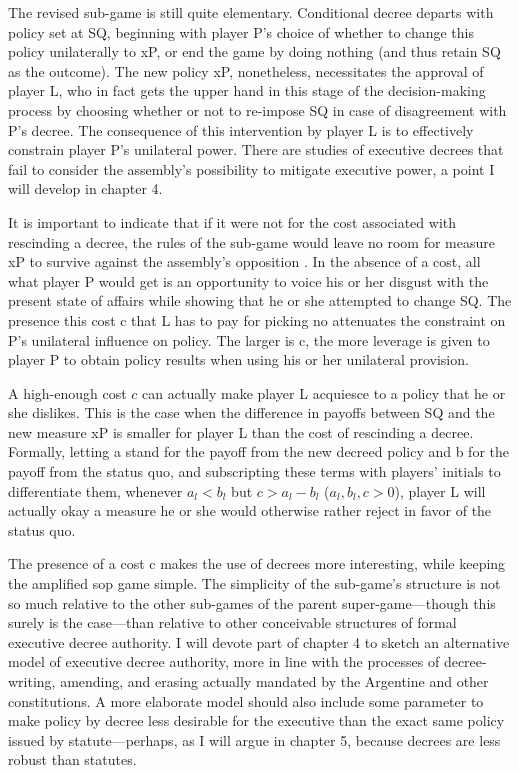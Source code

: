 The revised sub-game is still quite elementary.  Conditional decree departs with policy set at SQ, beginning with player P's choice of whether to change this policy unilaterally to xP, or end the game by doing nothing (and thus retain SQ as the outcome).  The new policy xP, nonetheless, necessitates the approval of player L, who in fact gets the upper hand in this stage of the decision-making process by choosing whether or not to re-impose SQ in case of disagreement with P's decree.  The consequence of this intervention by player L is to effectively constrain player P's unilateral power.  There are studies of executive decrees that fail to consider the assembly's possibility to mitigate executive power, a point I will develop in chapter 4.  

It is important to indicate that if it were not for the cost associated with rescinding a decree, the rules of the sub-game would leave no room for measure xP to survive against the assembly's opposition \citep{shugart.invExPty.1998,power.1998}.  In the absence of a cost, all what player P would get is an opportunity to voice his or her disgust with the present state of affairs while showing that he or she attempted to change SQ.  The presence this cost c that L has to pay for picking no attenuates the constraint on P's unilateral influence on policy.  The larger is c, the more leverage is given to player P to obtain policy results when using his or her unilateral provision.  

A high-enough cost $c$ can actually make player L acquiesce to a policy that he or she dislikes.  This is the case when the difference in payoffs between SQ and the new measure xP is smaller for player L than the cost of rescinding a decree.  Formally, letting a stand for the payoff from the new decreed policy and b for the payoff from the status quo, and subscripting these terms with players' initials to differentiate them, whenever $a_l < b_l$ but $c > a_l - b_l$ ($a_l, b_l, c>0$), player L will actually okay a measure he or she would otherwise rather reject in favor of the status quo.  

The presence of a cost c makes the use of decrees more interesting, while keeping the amplified sop game simple.  The simplicity of the sub-game's structure is not so much relative to the other sub-games of the parent super-game---though this surely is the case---than relative to other conceivable structures of formal executive decree authority.  I will devote part of chapter 4 to sketch an alternative model of executive decree authority, more in line with the processes of decree-writing, amending, and erasing actually mandated by the Argentine and other constitutions.  A more elaborate model should also include some parameter to make policy by decree less desirable for the executive than the exact same policy issued by statute---perhaps, as I will argue in chapter 5, because decrees are less robust than statutes.  

